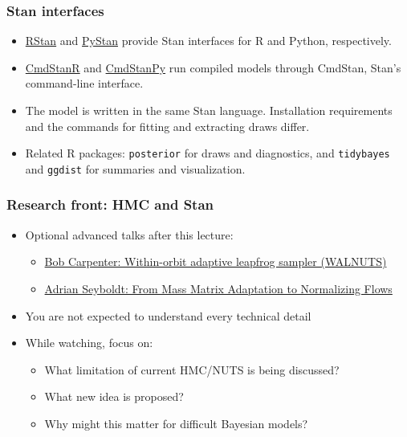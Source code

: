 \documentclass[10pt]{beamer}
\begin{document}
\begin{frame}[fragile]

\frametitle{Stan interfaces}

  \begin{itemize}
  \item \href{https://mc-stan.org/rstan/}{RStan} and
    \href{https://pystan.readthedocs.io/}{PyStan} provide Stan interfaces
    for R and Python, respectively.
  \item \href{https://mc-stan.org/cmdstanr/}{CmdStanR} and
    \href{https://mc-stan.org/cmdstanpy/}{CmdStanPy} run compiled models
    through CmdStan, Stan's command-line interface.
  \item The model is written in the same Stan language. Installation
    requirements and the commands for fitting and extracting draws differ.
  \item Related R packages: \texttt{posterior} for draws and diagnostics,
    and \texttt{tidybayes} and \texttt{ggdist} for summaries and visualization.
  \end{itemize}

\end{frame}


\begin{frame}

\frametitle{Research front: HMC and Stan}

{\small
  \begin{itemize}
  \item Optional advanced talks after this lecture:
    \begin{itemize}
    \item \href{https://www.youtube.com/watch?v=Usjt1cK5fQc}{Bob Carpenter: Within-orbit adaptive leapfrog sampler (WALNUTS)}
    \item \href{https://www.youtube.com/watch?v=wIR1YXFrNaE}{Adrian Seyboldt: From Mass Matrix Adaptation to Normalizing Flows}
    \end{itemize}
  \item You are not expected to understand every technical detail
  \item While watching, focus on:
    \begin{itemize}
    \item What limitation of current HMC/NUTS is being discussed?
    \item What new idea is proposed?
    \item Why might this matter for difficult Bayesian models?
    \end{itemize}
  \end{itemize}
}

\end{frame}
\end{document}
